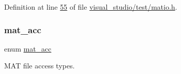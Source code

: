Definition at line \hyperlink{visual__studio_2test_2matio_8h_source_l00055}{55} of file \hyperlink{visual__studio_2test_2matio_8h_source}{visual\+\_\+studio/test/matio.\+h}.

\mbox{\label{group___m_a_t_gaa9dcbc70f538af79bd557593ff6b5cdb}} 
\subsubsection{\texorpdfstring{mat\+\_\+acc}{mat\_acc}\hspace{0.1cm}{\footnotesize\ttfamily [2/2]}}
{\footnotesize\ttfamily enum \hyperlink{group___m_a_t_gaa9dcbc70f538af79bd557593ff6b5cdb}{mat\+\_\+acc}}



M\+AT file access types. 

